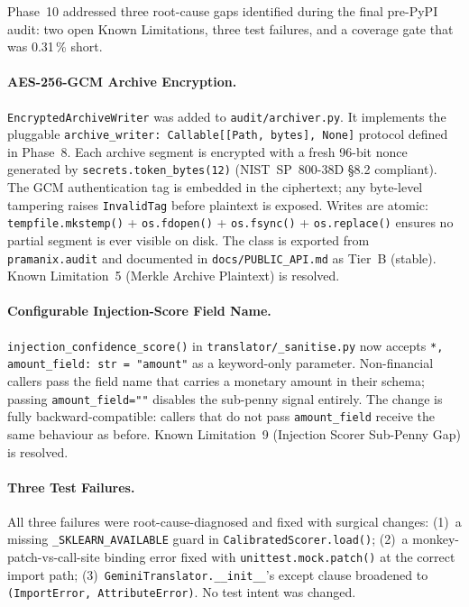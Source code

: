 \documentclass[12pt,a4paper,oneside]{report}
\newcommand{\fname}[1]{\texttt{#1}}          %
\newcommand{\code}[1]{\texttt{#1}}           %
\begin{document}
Phase~10 addressed three root-cause gaps identified during the final pre-PyPI
audit: two open Known Limitations, three test failures, and a coverage gate
that was 0.31\,\% short.

\paragraph{AES-256-GCM Archive Encryption.}
\code{EncryptedArchiveWriter} was added to \fname{audit/archiver.py}.  It
implements the pluggable \code{archive\_writer: Callable[[Path, bytes], None]}
protocol defined in Phase~8.  Each archive segment is encrypted with a fresh
96-bit nonce generated by \code{secrets.token\_bytes(12)} (NIST~SP~800-38D
\S8.2 compliant).  The GCM authentication tag is embedded in the ciphertext;
any byte-level tampering raises \code{InvalidTag} before plaintext is exposed.
Writes are atomic: \code{tempfile.mkstemp()} + \code{os.fdopen()} +
\code{os.fsync()} + \code{os.replace()} ensures no partial segment is ever
visible on disk.  The class is exported from \code{pramanix.audit} and
documented in \fname{docs/PUBLIC\_API.md} as Tier~B (stable).  Known
Limitation~5 (Merkle Archive Plaintext) is resolved.

\paragraph{Configurable Injection-Score Field Name.}
\code{injection\_confidence\_score()} in \fname{translator/\_sanitise.py} now
accepts \code{*, amount\_field: str = "amount"} as a keyword-only parameter.
Non-financial callers pass the field name that carries a monetary amount in
their schema; passing \code{amount\_field=""} disables the sub-penny signal
entirely.  The change is fully backward-compatible: callers that do not pass
\code{amount\_field} receive the same behaviour as before.  Known
Limitation~9 (Injection Scorer Sub-Penny Gap) is resolved.

\paragraph{Three Test Failures.}
All three failures were root-cause-diagnosed and fixed with surgical changes:
(1)~a missing \code{\_SKLEARN\_AVAILABLE} guard in \code{CalibratedScorer.load()};
(2)~a monkey-patch-vs-call-site binding error fixed with
\code{unittest.mock.patch()} at the correct import path;
(3)~\code{GeminiTranslator.\_\_init\_\_}'s except clause broadened to
\code{(ImportError, AttributeError)}.  No test intent was changed.
\end{document}
